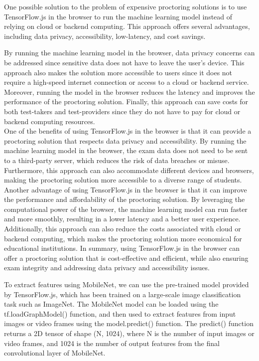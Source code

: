 \documentclass[journal]{IEEEtran}
\begin{document}
One possible solution to the problem of expensive proctoring solutions is to use TensorFlow.js in the browser to run the machine learning model instead of relying on cloud or backend computing. This approach offers several advantages, including data privacy, accessibility, low-latency, and cost savings.

By running the machine learning model in the browser, data privacy concerns can be addressed since sensitive data does not have to leave the user’s device. This approach also makes the solution more accessible to users since it does not require a high-speed internet connection or access to a cloud or backend service. Moreover, running the model in the browser reduces the latency and improves the performance of the proctoring solution. Finally, this approach can save costs for both test-takers and test-providers since they do not have to pay for cloud or backend computing resources.\\

One of the benefits of using TensorFlow.js in the browser is that it can provide a proctoring solution that respects data privacy and accessibility. By running the machine learning model in the browser, the exam data does not need to be sent to a third-party server, which reduces the risk of data breaches or misuse. Furthermore, this approach can also accommodate different devices and browsers, making the proctoring solution more accessible to a diverse range of students. Another advantage of using TensorFlow.js in the browser is that it can improve the performance and affordability of the proctoring solution. By leveraging the computational power of the browser, the machine learning model can run faster and more smoothly, resulting in a lower latency and a better user experience. Additionally, this approach can also reduce the costs associated with cloud or backend computing, which makes the proctoring solution more economical for educational institutions. In summary, using TensorFlow.js in the browser can offer a proctoring solution that is cost-effective and efficient, while also ensuring exam integrity and addressing data privacy and accessibility issues.


To extract features using MobileNet, we can use the pre-trained model provided by TensorFlow.js, which has been trained on a large-scale image classification task such as ImageNet. The MobileNet model can be loaded using the tf.loadGraphModel() function, and then used to extract features from input images or video frames using the model.predict() function. The predict() function returns a 2D tensor of shape (N, 1024), where N is the number of input images or video frames, and 1024 is the number of output features from the final convolutional layer of MobileNet.\\
\end{document}
